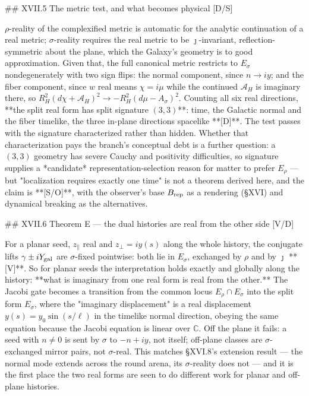 ## XVII.5 The metric test, and what becomes physical [D/S]

$\rho$-reality of the complexified metric is automatic for the analytic continuation of a real metric; $\sigma$-reality requires the real metric to be $\jmath$-invariant, reflection-symmetric about the plane, which the Galaxy's geometry is to good approximation. Given that, the full canonical metric restricts to $E_\sigma$ nondegenerately with two sign flips: the normal component, since $n\to iy$; and the fiber component, since $w$ real means $\chi = i\mu$ while the continued $\mathcal A_H$ is imaginary there, so $R_H^2(d\chi+\mathcal A_H)^2\to-R_H^2(d\mu-A_\sigma)^2$. Counting all six real directions, **the split real form has split signature $(3,3)$**: time, the Galactic normal and the fiber timelike, the three in-plane directions spacelike **[D]**. The test passes with the signature characterized rather than hidden. Whether that characterization pays the branch's conceptual debt is a further question: a $(3,3)$ geometry has severe Cauchy and positivity difficulties, so signature supplies a *candidate* representation-selection reason for matter to prefer $E_\rho$ — but "localization requires exactly one time" is not a theorem derived here, and the claim is **[S/O]**, with the observer's base $B_{\rm rep}$ as a rendering (§XVI) and dynamical breaking as the alternatives.

## XVII.6 Theorem E — the dual histories are real from the other side [V/D]

For a planar seed, $z_\parallel$ real and $z_\perp = iy(s)$ along the whole history, the conjugate lifts $\gamma\pm iY_{\rm gal}$ are $\sigma$-fixed pointwise: both lie in $E_\sigma$, exchanged by $\rho$ and by $\jmath$ **[V]**. So for planar seeds the interpretation holds exactly and globally along the history: **what is imaginary from one real form is real from the other.** The Jacobi gate becomes a transition from the common locus $E_\rho\cap E_\sigma$ into the split form $E_\sigma$, where the "imaginary displacement" is a real displacement $y(s) = y_0\sin(s/\ell)$ in the timelike normal direction, obeying the same equation because the Jacobi equation is linear over $\mathbb C$. Off the plane it fails: a seed with $n\neq0$ is sent by $\sigma$ to $-n+iy$, not itself; off-plane classes are $\sigma$-exchanged mirror pairs, not $\sigma$-real. This matches §XVI.8's extension result — the normal mode extends across the round arena, its $\sigma$-reality does not — and it is the first place the two real forms are seen to do different work for planar and off-plane histories.

